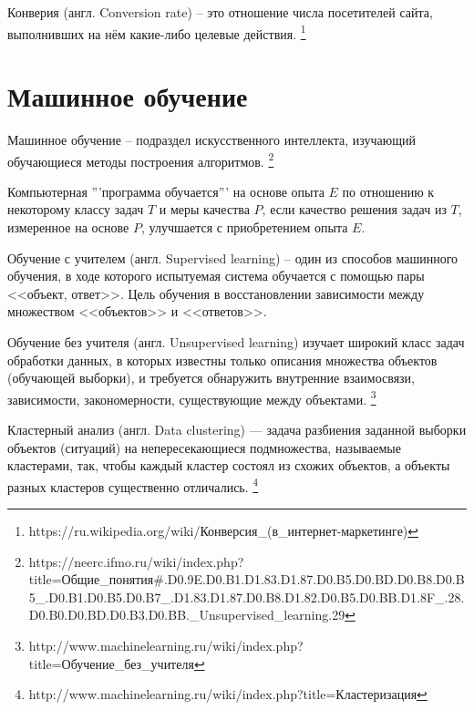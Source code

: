 \documentclass[times,specification,annotation]{itmo-student-thesis}
\begin{document}
\begin{definition}
    Конверия (англ. Conversion rate) – это отношение числа посетителей сайта, выполнивших на нём какие-либо целевые действия.
    \footnote{https://ru.wikipedia.org/wiki/Конверсия_(в_интернет-маркетинге)}
\end{definition}


\section{Машинное обучение}

\begin{definition}
    Машинное обучение – подраздел искусственного интеллекта, изучающий обучающиеся методы построения алгоритмов.
    \footnote{\label{fn:ml_neerc} https://neerc.ifmo.ru/wiki/index.php?title=Общие_понятия#.D0.9E.D0.B1.D1.83.D1.87.D0.B5.D0.BD.D0.B8.D0.B5_.D0.B1.D0.B5.D0.B7_.D1.83.D1.87.D0.B8.D1.82.D0.B5.D0.BB.D1.8F_.28.D0.B0.D0.BD.D0.B3.D0.BB._Unsupervised_learning.29}
\end{definition}

\begin{definition}
    Компьютерная '''программа обучается''' на основе опыта $E$ по отношению к некоторому классу задач $T$ и меры качества $P$,
    если качество решения задач из $T$, измеренное на основе $P$, улучшается с приобретением опыта $E$.
    \footnotemark[\ref{fn:ml_neerc}]
\end{definition}

\begin{definition}
    Обучение с учителем (англ. Supervised learning) – один из способов машинного обучения, 
    в ходе которого испытуемая система обучается с помощью пары <<объект, ответ>>.
    Цель обучения в восстановлении зависимости между множеством <<объектов>> и <<ответов>>.
\end{definition}

\begin{definition}
    Обучение без учителя (англ. Unsupervised learning) изучает широкий класс задач обработки данных, 
    в которых известны только описания множества объектов (обучающей выборки), и 
    требуется обнаружить внутренние взаимосвязи, зависимости, закономерности, существующие между объектами.
    \footnote{http://www.machinelearning.ru/wiki/index.php?title=Обучение_без_учителя}
\end{definition}

\begin{definition}
    Кластерный анализ (англ. Data clustering) — задача разбиения заданной выборки объектов (ситуаций) на непересекающиеся подмножества, 
    называемые кластерами, так, чтобы каждый кластер состоял из схожих объектов, а объекты разных кластеров существенно отличались.
    \footnote{http://www.machinelearning.ru/wiki/index.php?title=Кластеризация}
\end{definition}
\end{document}
